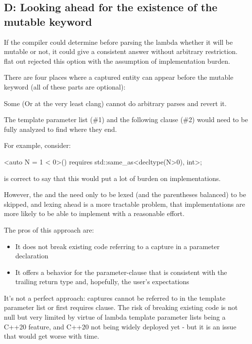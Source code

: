 \documentclass{wg21}
\begin{document}
\subsection{D: Looking ahead for the existence of the mutable keyword}

If the compiler could determine before parsing the lambda whether it will be mutable or not, it could give a consistent answer without arbitrary restriction.
 flat out rejected this option with the assumption of implementation burden.

There are four places where a captured entity can appear before the mutable keyword
(all of these parts are optional):


Some (Or at the very least clang) cannot do arbitrary parses and revert it.

The template parameter list (\#1) and the following  clause (\#2) would need to be fully analyzed to find where they end.

For example, consider:

\begin{colorblock}
[]<auto N = 1 < 0>() requires std::same_as<decltype(N>0), int>{};
\end{colorblock}

 is correct to say that this would put a lot of burden on implementations.

However, the  and the 
need only to be lexed (and the parentheses balanced) to be skipped, and lexing ahead is a more tractable problem,
that implementations are more likely to be able to implement with a reasonable effort.

The pros of this approach are:
\begin{itemize}
\item It does not break existing code referring to a capture in a parameter declaration
\item It offers a behavior for the parameter-clause that is consistent with the trailing return type and, hopefully, the user's expectations
\end{itemize}

It's not a perfect approach: captures cannot be referred to in the template parameter list or first
requires clause.
The risk of breaking existing code is not null but very limited by virtue of lambda template parameter lists being a C++20 feature,
and C++20 not being widely deployed yet - but it is an issue that would get worse with time.
\end{document}
